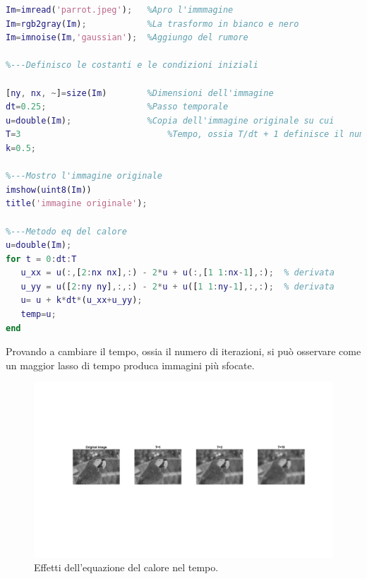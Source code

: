 \begin{lstlisting}[language=MATLAB]
Im=imread('parrot.jpeg');   %Apro l'immmagine
Im=rgb2gray(Im);            %La trasformo in bianco e nero
Im=imnoise(Im,'gaussian');  %Aggiungo del rumore

%---Definisco le costanti e le condizioni iniziali

[ny, nx, ~]=size(Im)        %Dimensioni dell'immagine
dt=0.25;                    %Passo temporale
u=double(Im);               %Copia dell'immagine originale su cui                                lavorare
T=3			                    %Tempo, ossia T/dt + 1 definisce il numero                           di iterazioni da eseguire
k=0.5;

%---Mostro l'immagine originale
imshow(uint8(Im))
title('immagine originale'); 

%---Metodo eq del calore
u=double(Im);
for t = 0:dt:T
   u_xx = u(:,[2:nx nx],:) - 2*u + u(:,[1 1:nx-1],:);  % derivata                                                           seconda lungo x
   u_yy = u([2:ny ny],:,:) - 2*u + u([1 1:ny-1],:,:);  % derivata                                                           seconda lungo y
   u= u + k*dt*(u_xx+u_yy);
   temp=u;
end

\end{lstlisting}
\newpage
Provando a cambiare il tempo, ossia il numero di iterazioni, si può osservare come un maggior lasso di tempo produca immagini più sfocate.

\begin{figure} 
\centering
\includegraphics[scale=0.255, trim = 8.9cm 16.9cm 6.9cm 14.9cm, clip]{Pictures/Risultati/eq del calore_striscia.png}
\caption{Effetti dell'equazione del calore nel tempo.}\label{fig:figura}
\end{figure}


